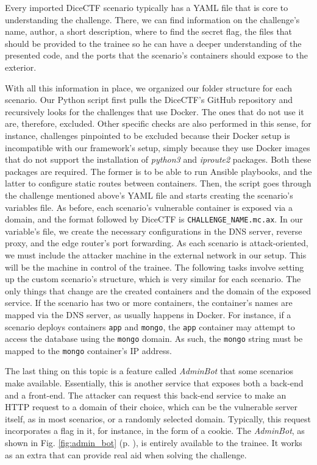 Every imported DiceCTF scenario typically has a YAML file that is core to understanding the challenge. There, we can find information on the challenge's name, author, a short description, where to find the secret flag, the files that should be provided to the trainee so he can have a deeper understanding of the presented code, and the ports that the scenario's containers should expose to the exterior.

With all this information in place, we organized our folder structure for each scenario. Our Python script first pulls the DiceCTF's GitHub repository and recursively looks for the challenges that use Docker. The ones that do not use it are, therefore, excluded. Other specific checks are also performed in this sense, for instance, challenges pinpointed to be excluded because their Docker setup is incompatible with our framework's setup, simply because they use Docker images that do not support the installation of \textit{python3} and \textit{iproute2} packages. Both these packages are required. The former is to be able to run Ansible playbooks, and the latter to configure static routes between containers.
Then, the script goes through the challenge mentioned above's YAML file and starts creating the scenario's variables file. As before, each scenario's vulnerable container is exposed via a domain, and the format followed by DiceCTF is \texttt{{CHALLENGE\_NAME}.mc.ax}. In our variable's file, we create the necessary configurations in the DNS server, reverse proxy, and the edge router's port forwarding. As each scenario is attack-oriented, we must include the attacker machine in the external network in our setup. This will be the machine in control of the trainee. The following tasks involve setting up the custom scenario's structure, which is very similar for each scenario. The only things that change are the created containers and the domain of the exposed service. If the scenario has two or more containers, the container's names are mapped via the DNS server, as usually happens in Docker. For instance, if a scenario deploys containers \texttt{app} and \texttt{mongo}, the \texttt{app} container may attempt to access the database using the \texttt{mongo} domain. As such, the \texttt{mongo} string must be mapped to the \texttt{mongo} container's IP address.

The last thing on this topic is a feature called \textit{AdminBot} that some scenarios make available. Essentially, this is another service that exposes both a back-end and a front-end. The attacker can request this back-end service to make an HTTP request to a domain of their choice, which can be the vulnerable server itself, as in most scenarios, or a randomly selected domain. Typically, this request incorporates a flag in it, for instance, in the form of a cookie. The \textit{AdminBot}, as shown in Fig. \ref{fig:admin_bot} (p. \pageref{fig:admin_bot}), is entirely available to the trainee. It works as an extra that can provide real aid when solving the challenge.

